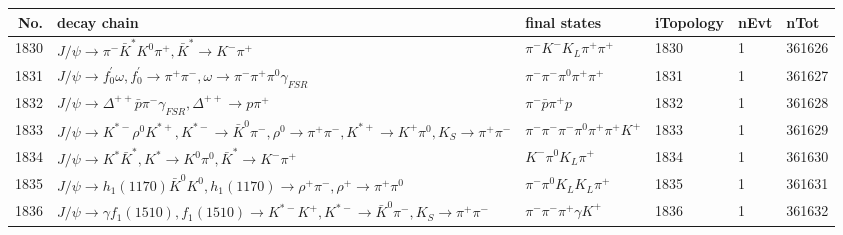 \begin{table}[htbp] 
\begin{center}
\begin{small}
\begin{tabular}{rlllll}\hline\hline
 No. & decay chain & final states &  iTopology & nEvt & nTot \\\hline
1830&$J/\psi       \rightarrow \pi^{-}        \bar{K}^{*}   K^{0}          \pi^{+}        , \bar{K}^{*}    \rightarrow K^{-}          \pi^{+}        $&$\pi^{-}        K^{-}          K_{L}          \pi^{+}        \pi^{+}        $& 1830&    1&361626\\
1831&$J/\psi       \rightarrow f^{'}_{0}     \omega         , f^{'}_{0}      \rightarrow \pi^{+}        \pi^{-}        , \omega          \rightarrow \pi^{-}        \pi^{+}        \pi^{0}        \gamma_{FSR} $&$\pi^{-}        \pi^{-}        \pi^{0}        \pi^{+}        \pi^{+}        $& 1831&    1&361627\\
1832&$J/\psi       \rightarrow \Delta^{++}       \bar{p}          \pi^{-}        \gamma_{FSR} , \Delta^{++}        \rightarrow p                 \pi^{+}        $&$\pi^{-}        \bar{p}          \pi^{+}        p                 $& 1832&    1&361628\\
1833&$J/\psi       \rightarrow K^{*-}         \rho^{0}      K^{*+}         , K^{*-}          \rightarrow \bar{K}^{0}   \pi^{-}        , \rho^{0}       \rightarrow \pi^{+}        \pi^{-}        , K^{*+}          \rightarrow K^{+}          \pi^{0}        , K_{S}           \rightarrow \pi^{+}        \pi^{-}        $&$\pi^{-}        \pi^{-}        \pi^{-}        \pi^{0}        \pi^{+}        \pi^{+}        K^{+}          $& 1833&    1&361629\\
1834&$J/\psi       \rightarrow K^{*}          \bar{K}^{*}   , K^{*}           \rightarrow K^{0}          \pi^{0}        , \bar{K}^{*}    \rightarrow K^{-}          \pi^{+}        $&$K^{-}          \pi^{0}        K_{L}          \pi^{+}        $& 1834&    1&361630\\
1835&$J/\psi       \rightarrow h_{1}(1170)    \bar{K}^{0}   K^{0}          , h_{1}(1170)     \rightarrow \rho^{+}      \pi^{-}        , \rho^{+}       \rightarrow \pi^{+}        \pi^{0}        $&$\pi^{-}        \pi^{0}        K_{L}          K_{L}          \pi^{+}        $& 1835&    1&361631\\
1836&$J/\psi       \rightarrow \gamma       f_{1}(1510)    , f_{1}(1510)     \rightarrow K^{*-}         K^{+}          , K^{*-}          \rightarrow \bar{K}^{0}   \pi^{-}        , K_{S}           \rightarrow \pi^{+}        \pi^{-}        $&$\pi^{-}        \pi^{-}        \pi^{+}        \gamma       K^{+}          $& 1836&    1&361632\\

\end{tabular}
\end{small}
\end{center}
\end{table}
